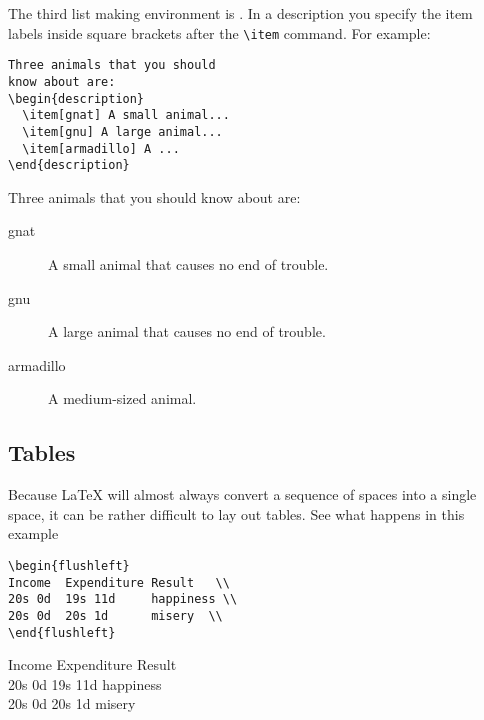 The third list making environment is .  In a description you
specify the item labels inside square brackets after the \verb|\item| command.
For example:
\egstart
\begin{verbatim}
Three animals that you should
know about are:
\begin{description}
  \item[gnat] A small animal...
  \item[gnu] A large animal...
  \item[armadillo] A ...
\end{description}
\end{verbatim}
\egmid%
Three animals that you should
know about are:
\begin{description}
  \item[gnat] A small animal that causes no end of trouble.
  \item[gnu] A large animal that causes no end of trouble.
  \item[armadillo] A medium-sized animal.
\end{description}
\egend

\subsection{Tables}

Because \LaTeX{} will almost always convert a sequence of spaces
into a single space,
it can be rather difficult to lay out tables.  See what happens in this example
\nolinebreak
\egstart
\begin{verbatim}
\begin{flushleft}
Income  Expenditure Result   \\
20s 0d  19s 11d     happiness \\
20s 0d  20s 1d      misery  \\
\end{flushleft}
\end{verbatim}
\egmid%
\begin{flushleft}
Income  Expenditure Result   \\
20s 0d  19s 11d     happiness \\
20s 0d  20s 1d      misery  \\
\end{flushleft}
\egend

